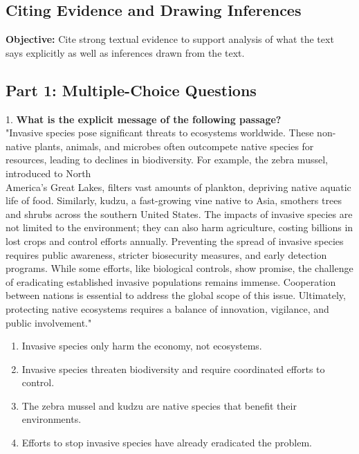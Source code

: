 \documentclass[12pt]{article}
\begin{document}
\subsection*{Citing Evidence and Drawing Inferences}
\onehalfspacing

\begin{tcolorbox}[colframe=black!40, colback=gray!0, title=Learning Objective]
\textbf{Objective:} Cite strong textual evidence to support analysis of what the text says explicitly as well as inferences drawn from the text.
\end{tcolorbox}

\subsection*{Part 1: Multiple-Choice Questions}

1. \textbf{What is the explicit message of the following passage? \\}  
"Invasive species pose significant threats to ecosystems worldwide. These non-native plants, animals, and microbes often outcompete native species for resources, leading to declines in biodiversity. For example, the zebra mussel, introduced to North \\America’s Great Lakes, filters vast amounts of plankton, depriving native aquatic life of food. Similarly, kudzu, a fast-growing vine native to Asia, smothers trees and shrubs across the southern United States. The impacts of invasive species are not limited to the environment; they can also harm agriculture, costing billions in lost crops and control efforts annually. Preventing the spread of invasive species requires public awareness, stricter biosecurity measures, and early detection programs. While some efforts, like biological controls, show promise, the challenge of eradicating established invasive populations remains immense. Cooperation between nations is essential to address the global scope of this issue. Ultimately, protecting native ecosystems requires a balance of innovation, vigilance, and public involvement."  
\begin{enumerate}[label=\Alph*.]
    \item Invasive species only harm the economy, not ecosystems.  
    \item Invasive species threaten biodiversity and require coordinated efforts to control.  
    \item The zebra mussel and kudzu are native species that benefit their environments.  
    \item Efforts to stop invasive species have already eradicated the problem.  
\end{enumerate}
\end{document}
